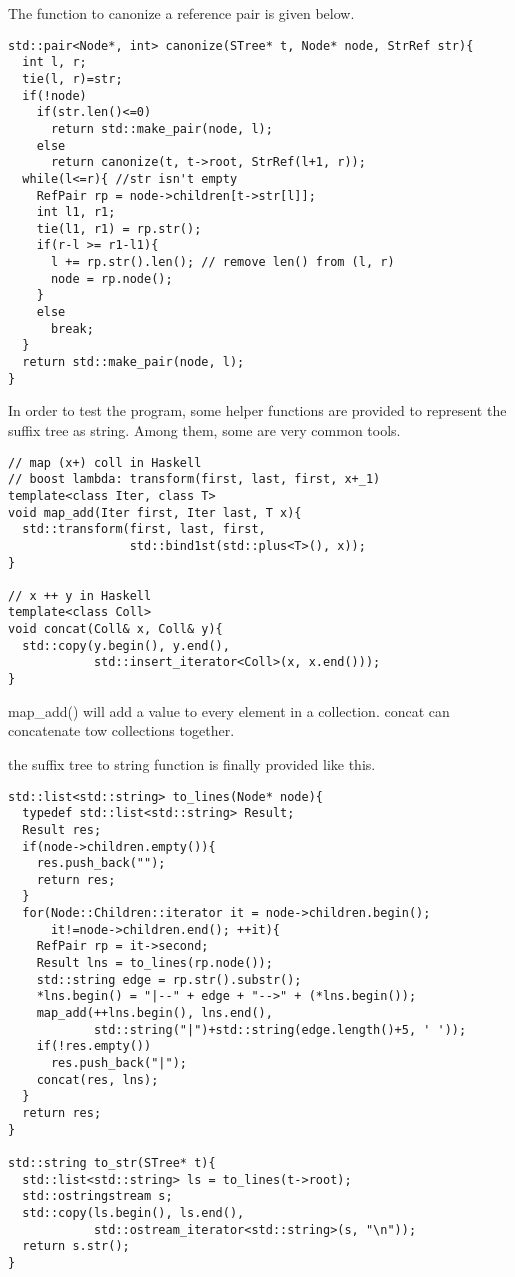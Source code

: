 \documentclass{article}
\begin{document}
The function to canonize a reference pair is given below.

\begin{lstlisting}
std::pair<Node*, int> canonize(STree* t, Node* node, StrRef str){
  int l, r;
  tie(l, r)=str;
  if(!node)
    if(str.len()<=0)
      return std::make_pair(node, l);
    else
      return canonize(t, t->root, StrRef(l+1, r));
  while(l<=r){ //str isn't empty
    RefPair rp = node->children[t->str[l]];
    int l1, r1;
    tie(l1, r1) = rp.str();
    if(r-l >= r1-l1){
      l += rp.str().len(); // remove len() from (l, r)
      node = rp.node();
    }
    else
      break;
  }
  return std::make_pair(node, l);
}
\end{lstlisting}

In order to test the program, some helper functions are provided
to represent the suffix tree as string. Among them, some are very
common tools.

\begin{lstlisting}
// map (x+) coll in Haskell
// boost lambda: transform(first, last, first, x+_1)
template<class Iter, class T>
void map_add(Iter first, Iter last, T x){
  std::transform(first, last, first, 
                 std::bind1st(std::plus<T>(), x));
}

// x ++ y in Haskell
template<class Coll>
void concat(Coll& x, Coll& y){
  std::copy(y.begin(), y.end(), 
            std::insert_iterator<Coll>(x, x.end()));
}
\end{lstlisting}

map\_add() will add a value to every element in a collection.
concat can concatenate tow collections together.

the suffix tree to string function is finally provided like this.

\begin{lstlisting}
std::list<std::string> to_lines(Node* node){
  typedef std::list<std::string> Result;
  Result res;
  if(node->children.empty()){
    res.push_back("");
    return res;
  }
  for(Node::Children::iterator it = node->children.begin();
      it!=node->children.end(); ++it){
    RefPair rp = it->second;
    Result lns = to_lines(rp.node());
    std::string edge = rp.str().substr();
    *lns.begin() = "|--" + edge + "-->" + (*lns.begin());
    map_add(++lns.begin(), lns.end(), 
            std::string("|")+std::string(edge.length()+5, ' '));
    if(!res.empty())
      res.push_back("|");
    concat(res, lns);
  }
  return res;
}

std::string to_str(STree* t){
  std::list<std::string> ls = to_lines(t->root);
  std::ostringstream s;
  std::copy(ls.begin(), ls.end(), 
            std::ostream_iterator<std::string>(s, "\n"));
  return s.str();
}
\end{lstlisting}
\end{document}
